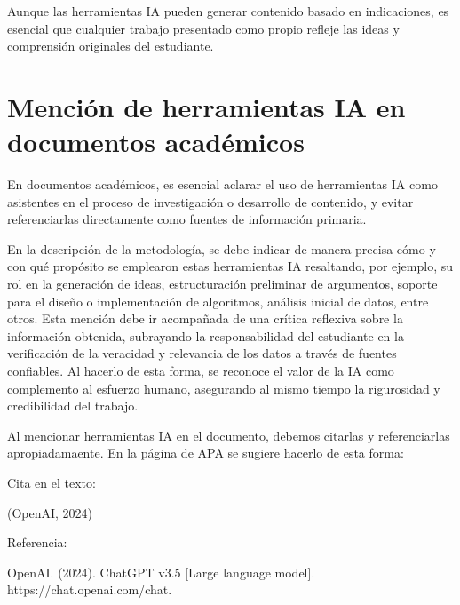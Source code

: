 Aunque las herramientas IA pueden generar contenido basado en indicaciones, es esencial que cualquier trabajo presentado como propio refleje las ideas y comprensión originales del estudiante. 

\section{Mención de herramientas IA en documentos académicos}
En documentos académicos, es esencial aclarar el uso de herramientas IA como asistentes en el proceso de investigación o desarrollo de contenido, y evitar referenciarlas directamente como fuentes de información primaria.

En la descripción de la metodología, se debe indicar de manera precisa cómo y con qué propósito se emplearon estas herramientas IA resaltando, por ejemplo, su rol en la generación de ideas, estructuración preliminar de argumentos, soporte para el diseño o implementación de algoritmos, análisis inicial de datos, entre otros. Esta mención debe ir acompañada de una crítica reflexiva sobre la información obtenida, subrayando la responsabilidad del estudiante en la verificación de la veracidad y relevancia de los datos a través de fuentes confiables. Al hacerlo de esta forma, se reconoce el valor de la IA como complemento al esfuerzo humano, asegurando al mismo tiempo la rigurosidad y credibilidad del trabajo. 

Al mencionar herramientas IA en el documento, debemos citarlas y referenciarlas apropiadamaente. En la página de APA se sugiere hacerlo de esta forma: 

Cita en el texto:  

(OpenAI, 2024) 

Referencia:  

OpenAI. (2024). ChatGPT v3.5 [Large language model].   
https://chat.openai.com/chat. 